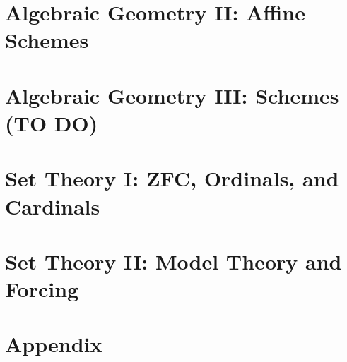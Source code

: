 \documentclass[11pt,twoside=semi,openright,numbers=noenddot]{scrbook}
\begin{document}
\part{Algebraic Geometry II: Affine Schemes}
\label{part:ag2}
\parttoc







\part{Algebraic Geometry III: Schemes (TO DO)}
\label{part:ag3}
\parttoc

\part{Set Theory I: ZFC, Ordinals, and Cardinals}
\label{part:st1}
\parttoc





\part{Set Theory II: Model Theory and Forcing}
\label{part:st2}
\parttoc




\part{Appendix}
\parttoc
\appendix







\backmatter

\clearpage
\printbibliography[type=image,title={Image Attributions}]
\printbibliography[nottype=image]
\end{document}
